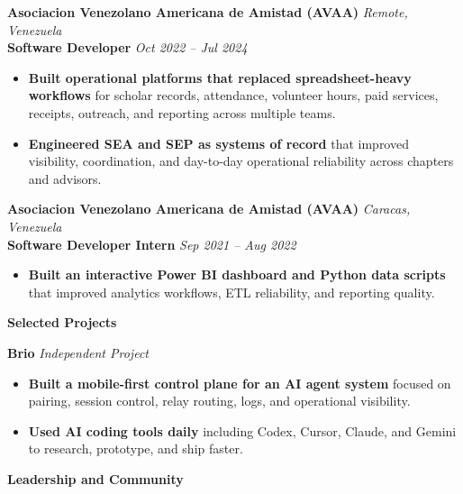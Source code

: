 \documentclass[11pt]{article}
\begin{document}
\vspace{8pt}
\textbf{Asociacion Venezolano Americana de Amistad (AVAA)} \hfill \textit{Remote, Venezuela} \\
\textbf{Software Developer} \hfill \textit{Oct 2022 -- Jul 2024}
\begin{itemize}
    \item \textbf{Built operational platforms that replaced spreadsheet-heavy workflows} for scholar records, attendance, volunteer hours, paid services, receipts, outreach, and reporting across multiple teams.
    \item \textbf{Engineered SEA and SEP as systems of record} that improved visibility, coordination, and day-to-day operational reliability across chapters and advisors.
\end{itemize}

\vspace{8pt}
\textbf{Asociacion Venezolano Americana de Amistad (AVAA)} \hfill \textit{Caracas, Venezuela} \\
\textbf{Software Developer Intern} \hfill \textit{Sep 2021 -- Aug 2022}
\begin{itemize}
    \item \textbf{Built an interactive Power BI dashboard and Python data scripts} that improved analytics workflows, ETL reliability, and reporting quality.
\end{itemize}

\vspace{6pt}
\begin{center}
    \textbf{Selected Projects}
\end{center}
\vspace{-4pt}

\textbf{Brio} \hfill \textit{Independent Project}
\begin{itemize}
    \item \textbf{Built a mobile-first control plane for an AI agent system} focused on pairing, session control, relay routing, logs, and operational visibility.
    \item \textbf{Used AI coding tools daily} including Codex, Cursor, Claude, and Gemini to research, prototype, and ship faster.
\end{itemize}

\vspace{6pt}
\begin{center}
    \textbf{Leadership and Community}
\end{center}
\vspace{-4pt}
\end{document}
